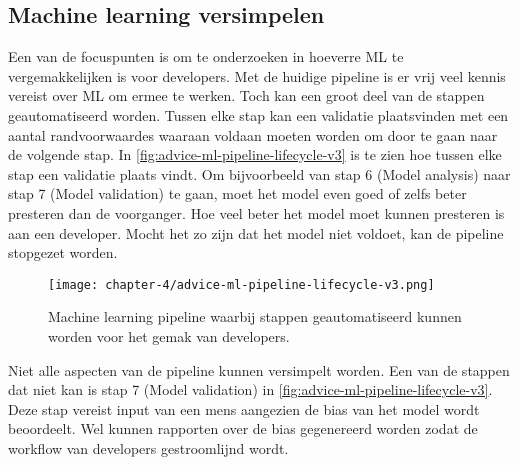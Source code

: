 \subsection{Machine learning versimpelen}\label{subsec:ch4-machine-learning-versimpelen}
Een van de focuspunten is om te onderzoeken in hoeverre ML te vergemakkelijken is voor developers. Met de huidige pipeline is er vrij veel kennis vereist over ML om ermee te werken. Toch kan een groot deel van de stappen geautomatiseerd worden. Tussen elke stap kan een validatie plaatsvinden met een aantal randvoorwaardes waaraan voldaan moeten worden om door te gaan naar de volgende stap. In \autoref{fig:advice-ml-pipeline-lifecycle-v3} is te zien hoe tussen elke stap een validatie plaats vindt. Om bijvoorbeeld van stap 6 (Model analysis) naar stap 7 (Model validation) te gaan, moet het model even goed of zelfs beter presteren dan de voorganger. Hoe veel beter het model moet kunnen presteren is aan een developer. Mocht het zo zijn dat het model niet voldoet, kan de pipeline stopgezet worden.

\begin{figure}[hbt!]
  \centering
  \texttt{[image: chapter-4/advice-ml-pipeline-lifecycle-v3.png]}
  \caption{Machine learning pipeline waarbij stappen geautomatiseerd kunnen worden voor het gemak van developers.}
  \label{fig:advice-ml-pipeline-lifecycle-v3}
\end{figure}

Niet alle aspecten van de pipeline kunnen versimpelt worden. Een van de stappen dat niet kan is stap 7 (Model validation) in \autoref{fig:advice-ml-pipeline-lifecycle-v3}. Deze stap vereist input van een mens aangezien de bias van het model wordt beoordeelt. Wel kunnen rapporten over de bias gegenereerd worden zodat de workflow van developers gestroomlijnd wordt.